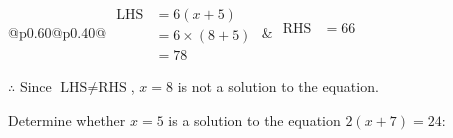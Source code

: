 \documentclass[12pt]{article}
\newcounter{minipagecount}
\begin{document}
\begin{multicols}{2}
\begin{minipage}[t]{0.40\textwidth}
    \renewcommand{\arraystretch}{1.3} %
    \begin{tabular}{@{}p{0.60\linewidth}@{}p{0.40\linewidth}@{}}
        \(\begin{aligned}
            \text{LHS} &= 6(x + 5) \\
                    &= 6 \times(8 + 5) \\
                    &= 78
        \end{aligned}\) &
        \(\begin{aligned}
            \text{RHS} &= 66\\
                    & \\
                    &
        \end{aligned}\)
    \end{tabular}
    \renewcommand{\arraystretch}{1.0} %
    \vspace{2pt}  %

    \noindent \(\therefore\) Since \(\text{LHS} \neq \text{RHS}\), \(x = 8\) is not  a solution to the equation.

\end{minipage}

 \vspace*{16pt}
\noindent{(\theminipagecount)}\hspace{0.1mm} %
\begin{minipage}[t]{0.40\textwidth} %

    \noindent Determine whether \(x = 5\) is a solution to the equation \(2(x + 7) = 24\):
    \vspace{4pt}  %

    \noindent


\end{minipage}
\end{multicols}
\end{document}
